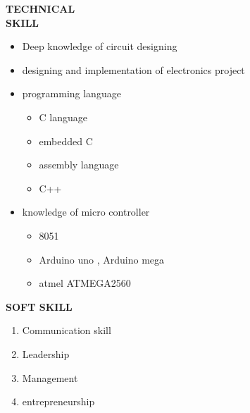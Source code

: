 \documentclass{article}
\begin{document}
   \begin{flushleft}
  \vspace{0.4in}
  \textbf{TECHNICAL  \\ SKILL}
  \begin{itemize}
  	\vspace{-0.45in}
  	\addtolength{\itemindent}{1.359in}
  	\item  Deep knowledge of circuit designing
  	\item  designing and implementation of electronics project
  	\item  programming language
  	{\begin{itemize}
  			\addtolength{\itemindent}{1.359in}
  			\item C language
  			\item embedded C
  			\item assembly language
  			\item C++
  			
  		\end{itemize}
  	}  
  	\item knowledge of micro controller
  	{\begin{itemize}
  			\addtolength{\itemindent}{1.359in}
  			\item 8051 
  			\item Arduino uno , Arduino mega
  			\item atmel ATMEGA2560
  			
  		\end{itemize}
  	}  
  	
  \end{itemize}
  \end{flushleft}

  	 	
 \begin{flushleft} 
  	 		
  	 		\vspace{0.4in}
  	 		\textbf{SOFT SKILL}
  	 		\begin{enumerate}
  	 			\vspace{-0.30in}
  	 			\addtolength{\itemindent}{1.359in}
  	 			\item Communication skill
  	 			\item Leadership 
  	 			\item Management 
  	 			\item entrepreneurship
  	 		\end{enumerate}
  	 	\end{flushleft}
 
\end{document}

